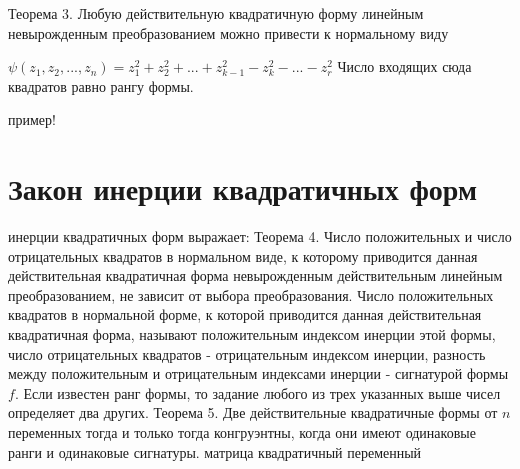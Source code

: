 \documentclass[a4paper,14pt]{report}
\newcommand\tab[1][1cm]{\hspace*{#1}}
\newcommand{\tl}{\newline\tab}
\begin{document}
Теорема 3. Любую действительную квадратичную форму линейным невырожденным преобразованием можно привести к нормальному виду

$\psi(z_1,z_2,...,z_n)=z_1^2+z_2^2+...+z_{k-1}^2-z_k^2-...-z_r^2$
Число входящих сюда квадратов равно рангу формы.

пример!

\section{Закон инерции квадратичных форм}
 инерции квадратичных форм выражает:
\tl
Теорема 4. Число положительных и число отрицательных квадратов в нормальном виде, к которому приводится данная действительная квадратичная форма невырожденным действительным линейным преобразованием, не зависит от выбора преобразования.
\tl
Число положительных квадратов в нормальной форме, к которой приводится данная действительная квадратичная форма, называют положительным индексом инерции этой формы, число отрицательных квадратов - отрицательным индексом инерции, разность между положительным и отрицательным индексами инерции - сигнатурой формы $f$. Если известен ранг формы, то задание любого из трех указанных выше чисел определяет два других.
\tl
Теорема 5. Две действительные квадратичные формы от $n$ переменных тогда и только тогда конгруэнтны, когда они имеют одинаковые ранги и одинаковые сигнатуры.
матрица квадратичный переменный
\end{document}
